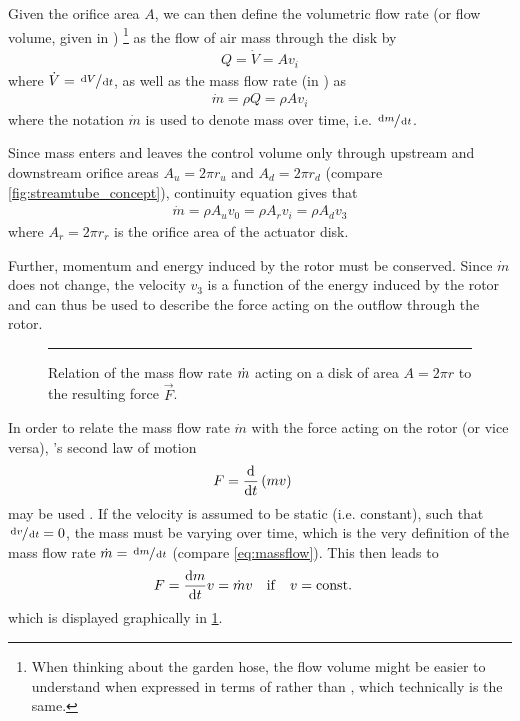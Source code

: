 Given the orifice area $A$, we can then define the volumetric flow rate %
(or flow volume, given in \withunit{\cubic\metre\per\second})%
\footnote{When
thinking about the garden hose, the flow volume might be easier to understand when expressed in terms of  rather than , which technically is the same.}
as the flow of air mass through the disk by
%
\begin{align}
Q = \dot{V} = A v_i \label{eq:flowvolume}
\end{align}
%
where $\dot{V} = \sfrac{\mathop{}\!\mathrm{d} V}{\mathop{}\!\mathrm{d} t}$, as well as the mass flow rate (in \withunit{\kilo\gram\per\second}) as
%
\begin{align}
\dot{m} = \rho Q = \rho A v_i \label{eq:massflow}
\end{align}
%
where the notation $\dot{m}$ is used to denote mass over time, i.e. $\sfrac{\mathop{}\!\mathrm{d} m}{\mathop{}\!\mathrm{d} t}$. %

Since mass enters and leaves the control volume only through upstream and downstream orifice areas $A_u = 2 \pi r_u$ and $A_d = 2 \pi r_d$ (compare \cref{fig:streamtube_concept}), continuity equation gives that 
%
\begin{align}
\dot{m} = \rho A_u v_0 = \rho A_r v_i = \rho A_d v_3 \label{eq:massflow_continuity}
\end{align}
%
where $A_r = 2 \pi r_r$ is the orifice area of the actuator disk.

Further, momentum and energy induced by the rotor must be conserved. 
Since $\dot{m}$ does not change, the velocity $v_3$ is a function of the energy induced by the rotor and can thus be used to describe the force acting on the outflow through the rotor.

\begin{figure}
	\centering
	

	\rule{35em}{0.5pt}
	\caption[Mass flow rate and force]
			{Relation of the mass flow rate $\dot{m}$ acting on a disk of area $A = 2\pi r$ to the resulting force $\vec{F}$.}
	\label{fig:mass_flow_force}
\end{figure}

In order to relate the mass flow rate $\dot{m}$ with the force acting on the rotor (or vice versa), 's second law of motion
%
\begin{align}
F &= \frac{\mathop{}\!\mathrm{d}}{\mathop{}\!\mathrm{d} t} \left( m v \right) \label{eq:newtons_2nd}
\end{align}
%
may be used \cite{book:siekmann2008}.
If the velocity is assumed to be static (i.e. constant), such that $\sfrac{\mathop{}\!\mathrm{d} v}{\mathop{}\!\mathrm{d} t} = 0$, the mass must be varying over time, which is the very definition of the mass flow rate $\dot{m} = \sfrac{\mathop{}\!\mathrm{d} m}{\mathop{}\!\mathrm{d} t}$ (compare \cref{eq:massflow}). 
This then leads to
%
\begin{align}
F &= \frac{\mathop{}\!\mathrm{d} m}{\mathop{}\!\mathrm{d} t} v = \dot{m} v \quad \mathrm{if} \quad v = \mathrm{const.} \label{eq:newtons_2nd_mdot}
\end{align}
%
which is displayed graphically in \cref{fig:mass_flow_force}.


